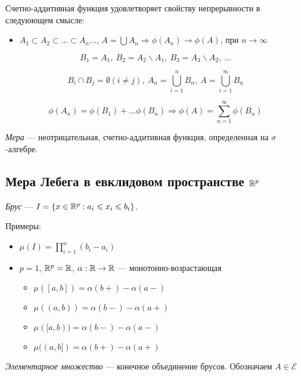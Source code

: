 Счетно-аддитивная функция удовлетворяет свойству непрерывности в следуюющем смысле:

\begin{itemize}
  \item $A_1 \subset A_2 \subset \ldots \subset A_n \ldots$, $A = \bigcup A_n \Rightarrow \phi(A_n)\to \phi(A)$, при $n \to \infty$
\end{itemize}

$$B_1 = A_1,\ B_2 = A_2 \backslash A_1,\ B_3 = A_3 \backslash A_2,\ \ldots$$

$$B_i \cap B_j = \emptyset (i \ne j),\ A_n = \bigcup_{i = 1}^{n} B_n,\ A = \bigcup_{i=1}^{\infty} B_n$$

$$\phi(A_n) = \phi(B_1) + \ldots \phi(B_n) \Rightarrow \phi(A) = \sum_{n = 1}^{\infty} \phi(B_n)$$


\begin{definition}
  \textit{Мера} --- неотрицательная, счетно-аддитивная функция, определенная на $\sigma$-алгебре.
\end{definition}




\subsection{Мера Лебега в евклидовом пространстве $\mathbb{R}^p$}

\begin{definition}
  \textit{Брус} --- $I = \left\{x \in \mathbb{R}^p : a_i \leqslant x_i \leqslant b_i \right\}$.
\end{definition}

Примеры:

\begin{itemize}
  \item $\mu(I) = \prod_{i = 1}^{n} (b_i - a_i)$
  \item $p = 1$, $\mathbb{R}^p = \mathbb{R}$, $\alpha : \mathbb{R} \to \mathbb{R}$ --- монотонно-возрастающая
  \begin{itemize}
    \item $\mu([a, b]) = \alpha(b+) - \alpha(a-)$
    \item $\mu((a, b)) = \alpha(b-) - \alpha(a+)$
    \item $\mu([a, b)) = \alpha(b-) - \alpha(a-)$
    \item $\mu((a, b]) = \alpha(b+) - \alpha(a+)$
  \end{itemize}
\end{itemize}

\begin{definition}
  \textit{Элементарное множество} --- конечное объединение брусов. Обозначаем $A \in \mathcal{E}$
\end{definition}

